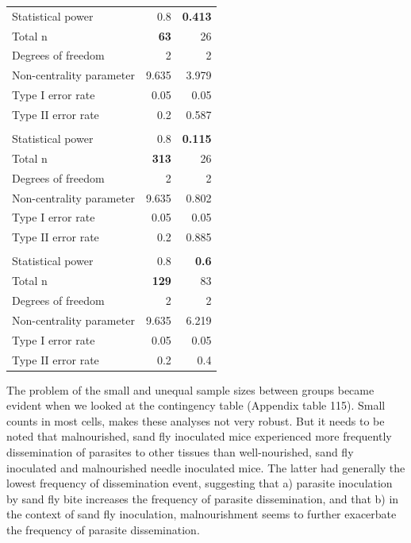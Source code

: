 \documentclass[
  12pt,
  letterpaper,
]{article}
\begin{document}
\begin{longtable}{l|rr}
\midrule\addlinespace[2.5pt]
\multicolumn{3}{l}{Liver} \\ 
\midrule\addlinespace[2.5pt]
Statistical power & 0.8 & \textbf{0.413} \\ 
Total n & \textbf{63} & 26 \\ 
Degrees of freedom & 2 & 2 \\ 
Non-centrality parameter & 9.635 & 3.979 \\ 
Type I error rate & 0.05 & 0.05 \\ 
Type II error rate & 0.2 & 0.587 \\ 
\midrule\addlinespace[2.5pt]
\multicolumn{3}{l}{Paw} \\ 
\midrule\addlinespace[2.5pt]
Statistical power & 0.8 & \textbf{0.115} \\ 
Total n & \textbf{313} & 26 \\ 
Degrees of freedom & 2 & 2 \\ 
Non-centrality parameter & 9.635 & 0.802 \\ 
Type I error rate & 0.05 & 0.05 \\ 
Type II error rate & 0.2 & 0.885 \\ 
\midrule\addlinespace[2.5pt]
\multicolumn{3}{l}{Spleen} \\ 
\midrule\addlinespace[2.5pt]
Statistical power & 0.8 & \textbf{0.6} \\ 
Total n & \textbf{129} & 83 \\ 
Degrees of freedom & 2 & 2 \\ 
Non-centrality parameter & 9.635 & 6.219 \\ 
Type I error rate & 0.05 & 0.05 \\ 
Type II error rate & 0.2 & 0.4 \\ 
\bottomrule
\end{longtable}

The problem of the small and unequal sample sizes between groups became evident when we looked at the contingency table (Appendix table 115). Small counts in most cells, makes these analyses not very robust. But it needs to be noted that malnourished, sand fly inoculated mice experienced more frequently dissemination of parasites to other tissues than well-nourished, sand fly inoculated and malnourished needle inoculated mice. The latter had generally the lowest frequency of dissemination event, suggesting that a) parasite inoculation by sand fly bite increases the frequency of parasite dissemination, and that b) in the context of sand fly inoculation, malnourishment seems to further exacerbate the frequency of parasite dissemination.
\end{document}
